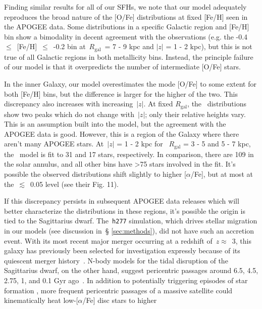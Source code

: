 \documentclass[fleqn, usenatbib]{mnras}
\begin{document}
Finding similar results for all of our SFHs, we note that our model adequately 
reproduces the broad nature of the [O/Fe] distributions at fixed [Fe/H] seen in 
the APOGEE data. Some distributions in a specific Galactic region and [Fe/H] 
bin show a bimodality in decent agreement with the observations (e.g. the 
-0.4~$\leq$~[Fe/H]~$\leq$~-0.2 bin at~$R_\text{gal}$~= 7 - 9 kpc and 
$\left|z\right|$ = 1 - 2 kpc), but this is not true of all Galactic regions in 
both metallicity bins. Instead, the principle failure of our model is that it 
overpredicts the number of intermediate [O/Fe] stars. 
\par 
In the inner Galaxy, our model overestimates the mode [O/Fe] to some extent for 
both [Fe/H] bins, but the difference is larger for the higher of the two. This 
discrepancy also increases with increasing~$\left|z\right|$. At fixed 
$R_\text{gal}$, the~\citet{Vincenzo2021a} distributions show two peaks which do 
not change with~$\left|z\right|$; only their relative heights vary. This is 
an assumption built into the model, but the agreement with the APOGEE data is 
good. However, this is a region of the Galaxy where there aren't many APOGEE 
stars. At~$\left|z\right|$ = 1 - 2 kpc for ~$R_\text{gal}$ = 3 - 5 and 5 - 7 
kpc, the~\citet{Vincenzo2021a} model is fit to 31 and 17 stars, respectively. In 
comparison, there are 109 in the solar annulus, and all other bins have >75 
stars involved in the fit. It's possible the observed distributions shift 
slightly to higher [$\alpha$/Fe], but at most at the~$\lesssim$~0.05 level 
(see their Fig. 11). 
\par 
If this discrepancy persists in subsequent APOGEE data releases which will 
better characterize the distributions in these regions, it's possible the 
origin is tied to the Sagittarius dwarf. The~\texttt{h277} simulation, which 
drives stellar migration in our models (see discussion in~\S 
\ref{sec:methods}), did not have such an accretion event. With its most recent 
major merger occurring at a redshift of~$z \approx$~3, this galaxy has 
previously been selected for investigation expressly because of its quiescent 
merger history~\citep[e.g.][]{Zolotov2012}. N-body models for the tidal 
disruption of the Sagittarius dwarf, on the other hand, suggest pericentric 
passages around 6.5, 4.5, 2.75, 1, and 0.1 Gyr ago~\citep{Law2010}. In addition 
to potentially triggering episodes of star formation 
\citep[e.g.][]{RuizLara2020}, more frequent pericentric passages of a massive 
satellite could kinematically heat low-[$\alpha$/Fe] disc stars to higher 
\end{document}
